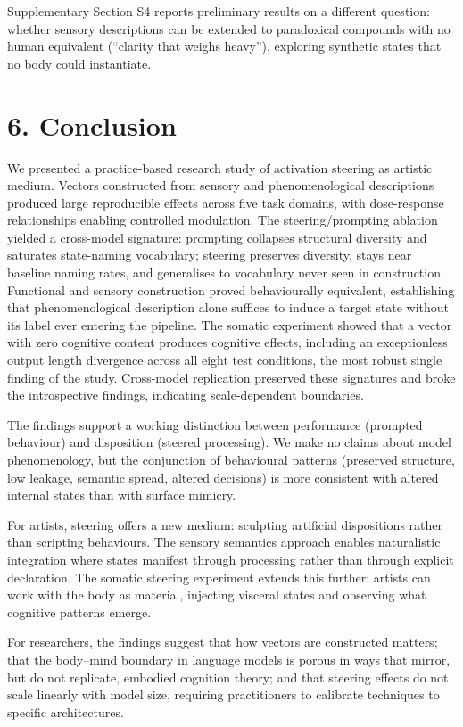 \documentclass[11pt,a4paper]{article}
\begin{document}
Supplementary Section S4 reports preliminary results on a different question: whether sensory descriptions can be extended to paradoxical compounds with no human equivalent (``clarity that weighs heavy''), exploring synthetic states that no body could instantiate.

\section*{6. Conclusion}

We presented a practice-based research study of activation steering as artistic medium. Vectors constructed from sensory and phenomenological descriptions produced large reproducible effects across five task domains, with dose-response relationships enabling controlled modulation. The steering/prompting ablation yielded a cross-model signature: prompting collapses structural diversity and saturates state-naming vocabulary; steering preserves diversity, stays near baseline naming rates, and generalises to vocabulary never seen in construction. Functional and sensory construction proved behaviourally equivalent, establishing that phenomenological description alone suffices to induce a target state without its label ever entering the pipeline. The somatic experiment showed that a vector with zero cognitive content produces cognitive effects, including an exceptionless output length divergence across all eight test conditions, the most robust single finding of the study. Cross-model replication preserved these signatures and broke the introspective findings, indicating scale-dependent boundaries.

The findings support a working distinction between performance (prompted behaviour) and disposition (steered processing). We make no claims about model phenomenology, but the conjunction of behavioural patterns (preserved structure, low leakage, semantic spread, altered decisions) is more consistent with altered internal states than with surface mimicry.

For artists, steering offers a new medium: sculpting artificial dispositions rather than scripting behaviours. The sensory semantics approach enables naturalistic integration where states manifest through processing rather than through explicit declaration. The somatic steering experiment extends this further: artists can work with the body as material, injecting visceral states and observing what cognitive patterns emerge.

For researchers, the findings suggest that how vectors are constructed matters; that the body--mind boundary in language models is porous in ways that mirror, but do not replicate, embodied cognition theory; and that steering effects do not scale linearly with model size, requiring practitioners to calibrate techniques to specific architectures.
\end{document}

